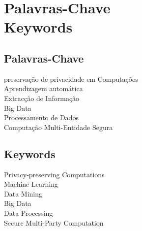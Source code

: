 %

\chapter*{Palavras-Chave \\ Keywords}
\thispagestyle{empty}

\section*{Palavras-Chave} %
{\large

preserva\c{c}\~{a}o de privacidade em Computa\c{c}\~{o}es      \\
Aprendizagem autom\'{a}tica         \\
Extrac\c{c}\~{a}o de Informa\c{c}\~{a}o \\
Big Data                                \\
Processamento de Dados                  \\
Computa\c{c}\~{a}o Multi-Entidade Segura\\
}

\section*{Keywords} %
{\large
Privacy-preserving Computations\\
Machine Learning               \\
Data Mining					   \\
Big Data 					   \\
Data Processing                \\
Secure Multi-Party Computation \\
}

\vfill

\cleardoublepage
